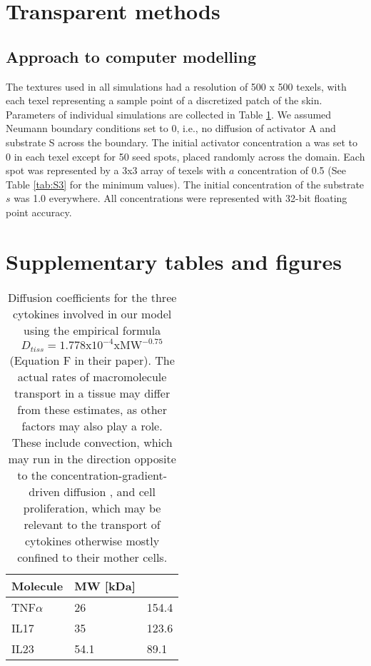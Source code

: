 \section{Transparent methods}
\subsection{Approach to computer modelling}
The textures used in all simulations had a resolution of 500 x 500 texels, with each texel representing a sample point of a discretized patch of the skin. Parameters of individual simulations are collected in Table \ref{tab:S1}. We assumed Neumann boundary conditions set to 0, i.e., no diffusion of activator A and substrate S across the boundary. The initial activator concentration a was set to 0 in each texel except for 50 seed spots, placed randomly across the domain.  Each spot was represented by a 3x3 array of texels with $a$ concentration of 0.5 (See Table \ref{tab:S3} for the minimum values). The initial concentration of the substrate $s$ was 1.0 everywhere.  All concentrations were represented with 32-bit floating point accuracy. 

\section{Supplementary tables and figures}
\begin{table}[!htb]
	\centering
	\begin{tabular}{|l|l|l|}
	\hline
	\textbf{Molecule}  & \textbf{MW [kDa]} & \bm{$D_{tiss}[\mu m^2 / s]$} \\ \hline 
	TNF$\alpha$ & 26   & 154.4 \\ \hline
	IL17        & 35   & 123.6 \\ \hline
	IL23        & 54.1 &  89.1 \\ \hline
	\end{tabular}
	\caption {Diffusion coefficients for the three cytokines involved in our model using the empirical formula $D_{tiss}=1.778\text{x}10^{-4}\text{xMW}^{-0.75}$ \citep{swabb1974}(Equation F in their paper). The actual rates of macromolecule transport in a tissue may differ from these estimates, as other factors may also play a role.  These include  convection, which may run in the direction opposite to the concentration-gradient-driven diffusion \citep{swabb1974}, and cell proliferation, which may be relevant to the transport of cytokines otherwise mostly confined to their mother cells.}
	\label{tab:S1}
\end{table}

